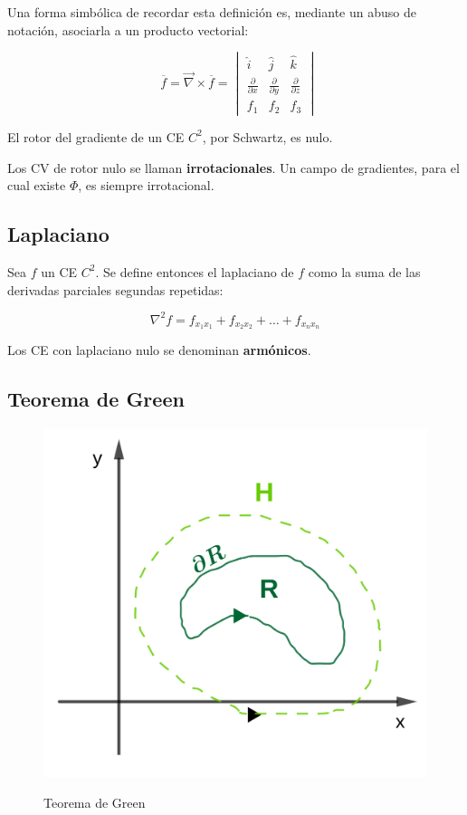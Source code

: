 \documentclass{article}
\begin{document}
Una forma simbólica de recordar esta definición es, mediante un abuso de notación, asociarla a un producto vectorial:

\begin{equation}
\mathop{\overline{rot}} \overline{f} = \overrightarrow{\nabla} \times \overline{f} = \begin{vmatrix}
\hat{i} & \hat{j} & \hat{k} \\
\frac{\partial}{\partial x} & \frac{\partial}{\partial y} & \frac{\partial}{\partial z} \\
f_1 & f_2 & f_3
\end{vmatrix}
\end{equation}

El rotor del gradiente de un CE $C^2$, por Schwartz, es nulo.

Los CV de rotor nulo se llaman \textbf{irrotacionales}. Un campo de gradientes, para el cual existe $\Phi$, es siempre irrotacional.

\subsection{Laplaciano}

Sea $f$ un CE $C^2$. Se define entonces el laplaciano de $f$ como la suma de las derivadas parciales segundas repetidas:

\begin{equation}
\nabla^2 f = f_{x_1 x_1} + f_{x_2 x_2} + \ldots + f_{x_n x_n}
\end{equation}

Los CE con laplaciano nulo se denominan \textbf{armónicos}.

\subsection{Teorema de Green}

\begin{figure}[ht]
\centering
\caption{Teorema de Green}
\includegraphics[scale=0.85]{img/teo_fig030_green.png}
\label{fig:green}
\end{figure}
\end{document}
